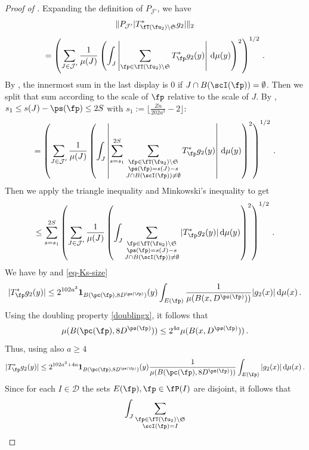 \begin{proof}[Proof of ]
    \leanok
    Expanding the definition of $P_{\mathcal{J}'}$, we have
    $$
        \|P_{\mathcal{J}'}|T_{\fT(\fu_2) \setminus \mathfrak{S}}^* g_2|\|_2
    $$
    $$
        = \left(\sum_{J \in \mathcal{J}'} \frac{1}{\mu(J)} \left(\int_J \left| \sum_{\fp \in \fT(\fu_2) \setminus \mathfrak{S}} T_{\fp}^* g_2(y) \right| \, \mathrm{d}\mu(y) \right)^2 \right)^{1/2}\,.
    $$
    By , the innermost sum in the last display is $0$ if $J \cap B(\scI(\fp)) = \emptyset$.
    Then we split that sum according to the scale of $\fp$ relative to the scale of $J$.
    By , $s_1 \le s(J) - \ps(\fp) \le 2S$ with $s_1 := \lfloor\frac{Zn}{202a^3} - 2\rfloor$:
    $$
        = \left(\sum_{J \in \mathcal{J}'} \frac{1}{\mu(J)} \left(\int_J \left| \sum_{s=s_1}^{2S} \sum_{\substack{\fp \in \fT(\fu_2) \setminus \mathfrak{S}\\ \ps(\fp) = s(J) - s\\
        J \cap B(\scI(\fp)) \ne \emptyset}} T_{\fp}^* g_2(y) \right| \, \mathrm{d}\mu(y) \right)^2 \right)^{1/2}\,.
    $$
    Then we apply the triangle inequality and Minkowski's inequality to get
    \begin{equation}
    \label{eq-sep-tree-small-1}
        \le \sum_{s=s_1}^{2S} \left( \sum_{J \in \mathcal{J}'} \frac{1}{\mu(J)} \left(\int_J \sum_{\substack{\fp \in \fT(\fu_2) \setminus \mathfrak{S}\\ \ps(\fp) = s(J) - s\\
        J \cap B(\scI(\fp)) \ne \emptyset}} |T_{\fp}^* g_2(y)| \, \mathrm{d}\mu(y) \right)^2\right)^{1/2}\,.
    \end{equation}
    We have by  and \eqref{eq-Ks-size}
    $$
        |T_{\fp}^* g_2(y)| \le 2^{102a^3} \mathbf{1}_{B(\pc(\fp), 8D^{\ps(\fp)})}(y) \int_{E(\fp)} \frac{1}{\mu(B(x, D^{\ps(\fp)}))} |g_2(x)| \, \mathrm{d}\mu(x)\,.
    $$
    Using the doubling property \eqref{doublingx}, it follows that
    $$
        \mu(B(\pc(\fp), 8D^{\ps(\fp)})) \le 2^{4a} \mu(B(x, D^{\ps(\fp)}))\,.
    $$
    Thus, using also $a \ge 4$
    $$
        |T_{\fp}^* g_2(y)| \le 2^{102a^3+4a} \mathbf{1}_{B(\pc(\fp), 8D^{\ps(\fp)})}(y) \frac{1}{\mu(B(\pc(\fp), 8D^{\ps(\fp)}))} \int_{E(\fp)} |g_2(x)| \, \mathrm{d}\mu(x)\,.
    $$
    Since for each $I \in \mathcal{D}$ the sets $E(\fp), \fp \in \fP(I)$ are disjoint, it follows that
    $$
        \int_J \sum_{\substack{\fp \in \fT(\fu_2) \setminus \mathfrak{S}\\ \scI(\fp) = I\\
}}$$
\end{proof}
